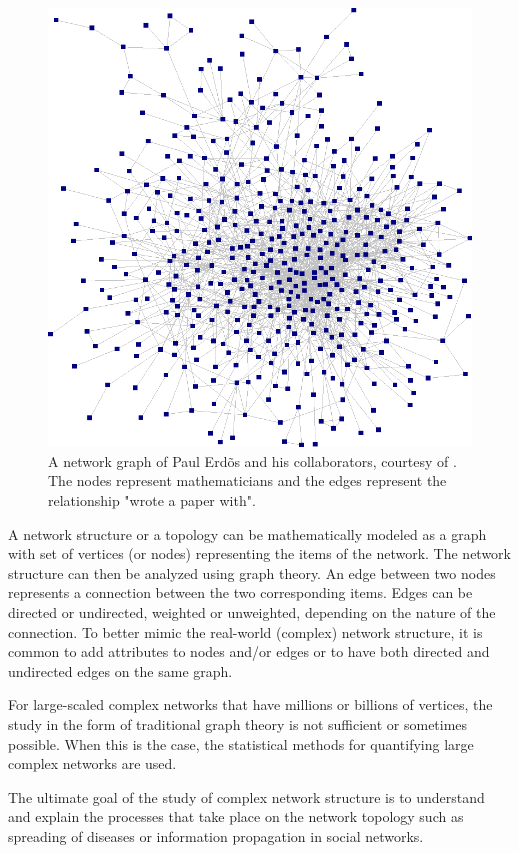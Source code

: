\documentclass[times, utf8, zavrsni]{fer}
\begin{document}
\begin{figure}[htp]
\centering
\includegraphics[scale = 0.3]{figs/alters2.png}
\caption{A network graph of Paul Erd\~os and his collaborators, courtesy of \cite{krebs}. The nodes represent mathematicians and the edges represent the relationship "wrote a paper with".}
\label{net}
\end{figure}
A network structure or a topology can be mathematically modeled as a graph with set of vertices (or nodes) representing the items of the network. The network structure can then be analyzed using graph theory. An edge between two nodes represents a connection between the two corresponding items. Edges can be directed or undirected, weighted or unweighted, depending  on the nature of the connection.  To better mimic the real-world (complex) network structure, it is common to add attributes to nodes and/or edges or to have both directed and undirected edges on the same graph.

For large-scaled complex networks that have millions or billions of vertices, the study in the form of traditional graph theory is not sufficient or sometimes possible. When this is the case, the statistical methods  for quantifying large complex networks are used. 

The ultimate goal of the study of complex network structure is to understand and explain the processes that take place on the network topology such as spreading of diseases or information propagation in social networks.
\end{document}
